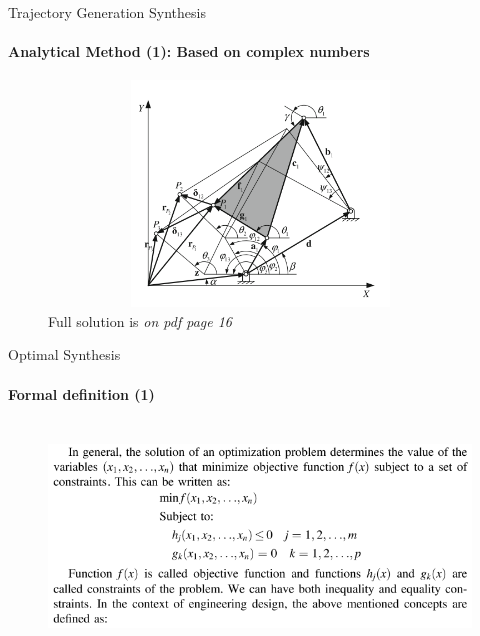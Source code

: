 \documentclass[aspectratio=169]{beamer}
\begin{document}
\begin{frame}[t]{Trajectory Generation Synthesis}
    \framesubtitle{Analytical Method (1): Based on complex numbers}
    \vspace{-0.7cm}
    \begin{figure}[H]
        \centering\includegraphics[height=6cm,width=1\textwidth,keepaspectratio]{traj_gen5.png}
        \vspace{-0.7cm}

        \caption*{Full solution is \textit{on pdf page 16}}
        \label{fig:traj_gen5.png}
    \end{figure}
\end{frame}

\begin{frame}[t]{Optimal Synthesis}
    \framesubtitle{Formal definition (1)}
    \vspace{-0.7cm}
    \begin{figure}[H]
        \centering\includegraphics[height=6cm,width=1\textwidth,keepaspectratio]{opti_gen1.png}
        \label{fig:opti_gen1.png}
    \end{figure}
\end{frame}
\end{document}
